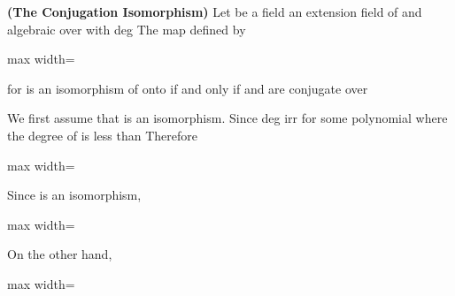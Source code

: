 \documentclass[11pt,oneside]{article}
\begin{document}
\begin{BookBody}
 \textbf{(The Conjugation Isomorphism)} Let  be a field an extension field of  and  algebraic over  with deg The map  defined by

\begin{center}\begin{adjustbox}{max width=\linewidth}\end{adjustbox}\end{center}

\noindent for  is an isomorphism of  onto  if and only if \BookInline{\alpha } and \BookInline{\beta } are conjugate over 

 We first assume that \BookInline{\psi _{\alpha,\allowbreak \beta }} is an isomorphism. Since deg irr for some polynomial  where the degree of  is less than  Therefore

\begin{center}\begin{adjustbox}{max width=\linewidth}\end{adjustbox}\end{center}

\noindent Since \BookInline{\psi _{\alpha,\allowbreak \beta }} is an isomorphism,

\begin{center}\begin{adjustbox}{max width=\linewidth}\end{adjustbox}\end{center}

\noindent On the other hand,

\begin{center}\begin{adjustbox}{max width=\linewidth}\end{adjustbox}\end{center}


\end{BookBody}
\end{document}
